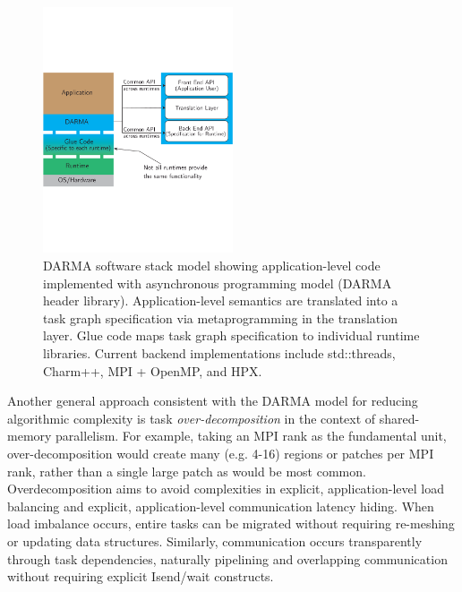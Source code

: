 \begin{figure}
\centering
\includegraphics[width=0.5\textwidth]{projects/2.3.1-PMR/2.3.1.04-SNL-ATDM-PMR/DARMA_Software_Stack.pdf}
\caption{DARMA software stack model showing application-level code implemented with asynchronous programming model (DARMA header library).
Application-level semantics are translated into a task graph specification via metaprogramming in the translation layer. Glue code maps task graph specification to individual runtime libraries. Current backend implementations include std::threads, Charm++, MPI + OpenMP, and HPX.}
\label{fig:darmaStack}
\end{figure}


Another general approach consistent with the DARMA model for reducing algorithmic complexity is task \emph{over-decomposition} in the context of shared-memory parallelism.
For example, taking an MPI rank as the fundamental unit, over-decomposition would create many (e.g. 4-16) regions or patches per MPI rank,
rather than a single large patch as would be most common.
Overdecomposition aims to avoid complexities in explicit, application-level load balancing and explicit, application-level communication latency hiding.
When load imbalance occurs, entire tasks can be migrated without requiring re-meshing or updating data structures.
Similarly, communication occurs transparently through task dependencies, naturally pipelining and overlapping communication without requiring explicit Isend/wait constructs.

